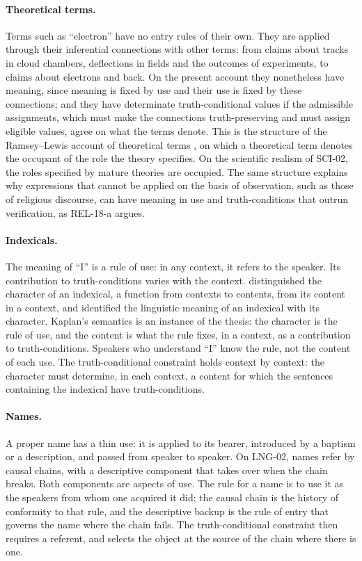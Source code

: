 \documentclass{situationist-preprint}
\begin{document}
\paragraph{Theoretical terms.} Terms such as \enquote{electron} have no entry rules of their own. They are applied through their inferential connections with other terms: from claims about tracks in cloud chambers, deflections in fields and the outcomes of experiments, to claims about electrons and back. On the present account they nonetheless have meaning, since meaning is fixed by use and their use is fixed by these connections; and they have determinate truth-conditional values if the admissible assignments, which must make the connections truth-preserving and must assign eligible values, agree on what the terms denote. This is the structure of the Ramsey--Lewis account of theoretical terms \citep{Lewis1970}, on which a theoretical term denotes the occupant of the role the theory specifies. On the scientific realism of SCI-02, the roles specified by mature theories are occupied. The same structure explains why expressions that cannot be applied on the basis of observation, such as those of religious discourse, can have meaning in use and truth-conditions that outrun verification, as REL-18-a argues.

\paragraph{Indexicals.} The meaning of \enquote{I} is a rule of use: in any context, it refers to the speaker. Its contribution to truth-conditions varies with the context. \citet{Kaplan1989} distinguished the character of an indexical, a function from contexts to contents, from its content in a context, and identified the linguistic meaning of an indexical with its character. Kaplan's semantics is an instance of the thesis: the character is the rule of use, and the content is what the rule fixes, in a context, as a contribution to truth-conditions. Speakers who understand \enquote{I} know the rule, not the content of each use. The truth-conditional constraint holds context by context: the character must determine, in each context, a content for which the sentences containing the indexical have truth-conditions.

\paragraph{Names.} A proper name has a thin use: it is applied to its bearer, introduced by a baptism or a description, and passed from speaker to speaker. On LNG-02, names refer by causal chains, with a descriptive component that takes over when the chain breaks. Both components are aspects of use. The rule for a name is to use it as the speakers from whom one acquired it did; the causal chain is the history of conformity to that rule, and the descriptive backup is the rule of entry that governs the name where the chain fails. The truth-conditional constraint then requires a referent, and selects the object at the source of the chain where there is one.
\end{document}
